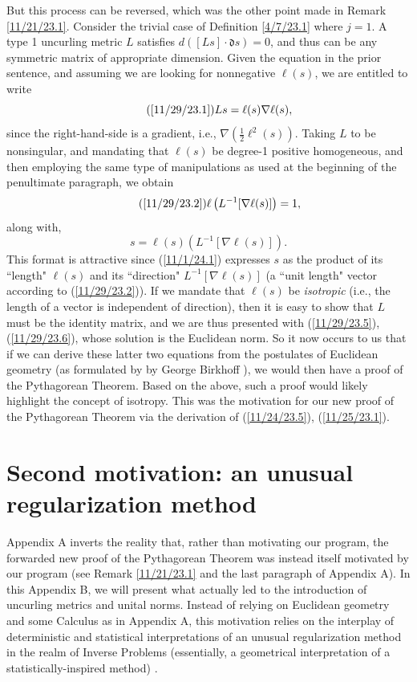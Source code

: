 \documentclass{amsart}
\numberwithin{equation}{section}
\theoremstyle{definition}
\numberwithin{theorem}{section}
\begin{document}
But this process can be reversed, which was the other point made in Remark \ref{11/21/23.1}.  Consider the trivial case of Definition \ref{4/7/23.1} where $j=1$.  A type 1 uncurling metric $L$ satisfies $d([Ls]\cdot \mathfrak{d}s)=0$, and thus can be any symmetric matrix of appropriate dimension.  Given the equation in the prior sentence, and assuming we are looking for nonnegative $\ell(s)$, we are entitled to write \begin{equation}\tag{\ref{11/29/23.1}} Ls = \ell(s)\nabla\ell(s),\end{equation} since the right-hand-side is a gradient, i.e., $\nabla(\frac{1}{2}\ell^2(s))$.  
Taking $L$ to be nonsingular, and mandating that $\ell(s)$ be degree-1 positive homogeneous, and then employing the same type of manipulations as used at the beginning of the penultimate paragraph, we obtain \begin{equation}\tag{\ref{11/29/23.2}}\ell\left(L^{-1}[\nabla\ell(s)]\right) = 1,\end{equation} along with, \begin{equation}\label{11/1/24.1} s = \ell(s)\left(L^{-1}[\nabla\ell(s)]\right).\end{equation}  
This format is attractive since (\ref{11/1/24.1}) expresses $s$ as the product of its ``length" $\ell(s)$ and its ``direction" $L^{-1}[\nabla\ell(s)]$ (a ``unit length" vector according to (\ref{11/29/23.2})).  If we mandate that $\ell(s)$ be {\it isotropic} (i.e., the length of a vector is independent of direction), then it is easy to show that $L$ must be the identity matrix, and we are thus presented with (\ref{11/29/23.5}), (\ref{11/29/23.6}), whose solution is the Euclidean norm. So it now occurs to us that if we can derive these latter two equations from the postulates of Euclidean geometry (as formulated by by George Birkhoff \cite{birkhoff:1932}), we would then have a proof of the Pythagorean Theorem.  Based on the above, such a proof would likely highlight the concept of isotropy. This was the motivation for our new proof of the Pythagorean Theorem via the derivation of (\ref{11/24/23.5}), (\ref{11/25/23.1}).
  
  

  \section{Second motivation: an unusual regularization method}
     Appendix A inverts the reality that, rather than motivating our program, the forwarded new proof of the Pythagorean Theorem was instead itself motivated by our program (see Remark \ref{11/21/23.1} and the last paragraph of Appendix A). In this Appendix B, we will present what actually led to the introduction of uncurling metrics and unital norms.  Instead of relying on Euclidean geometry and some Calculus as in Appendix A, this motivation relies on the interplay of deterministic and statistical interpretations of an unusual regularization method in the realm of Inverse Problems (essentially, a geometrical interpretation of a statistically-inspired method) \cite{fgreensite:2022d}.
  
\end{document}
